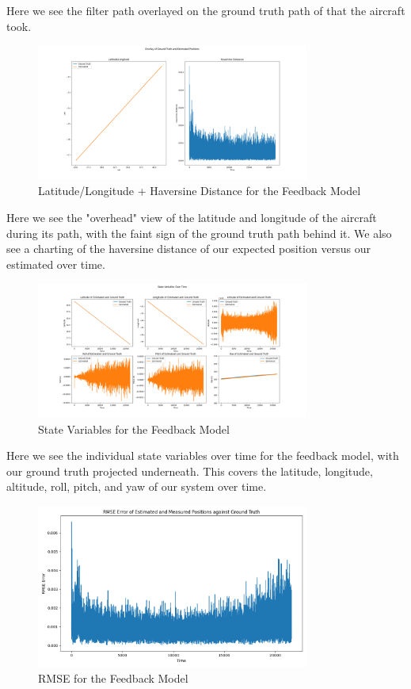 \documentclass{article}
\begin{document}
Here we see the filter path overlayed on the ground truth path of that the aircraft took.

\begin{figure}[H]
    \centering
    \includegraphics[width=0.8\textwidth]{./imgs/FB_latlon_haversines.png}
    \caption{Latitude/Longitude + Haversine Distance for the Feedback Model}
\end{figure}

Here we see the "overhead" view of the latitude and longitude of the aircraft during its path, with the faint sign of the ground truth path behind it. We also see a charting of the haversine distance of our expected position versus our estimated over time.

\begin{figure}[H]
    \centering
    \includegraphics[width=0.8\textwidth]{./imgs/FB_statevar.png}
    \caption{State Variables for the Feedback Model}
\end{figure}

Here we see the individual state variables over time for the feedback model, with our ground truth projected underneath. This covers the latitude, longitude, altitude, roll, pitch, and yaw of our system over time.

\begin{figure}[H]
    \centering
    \includegraphics[width=0.8\textwidth]{./imgs/FB_rmse.png}
    \caption{RMSE for the Feedback Model}
\end{figure}
\end{document}
